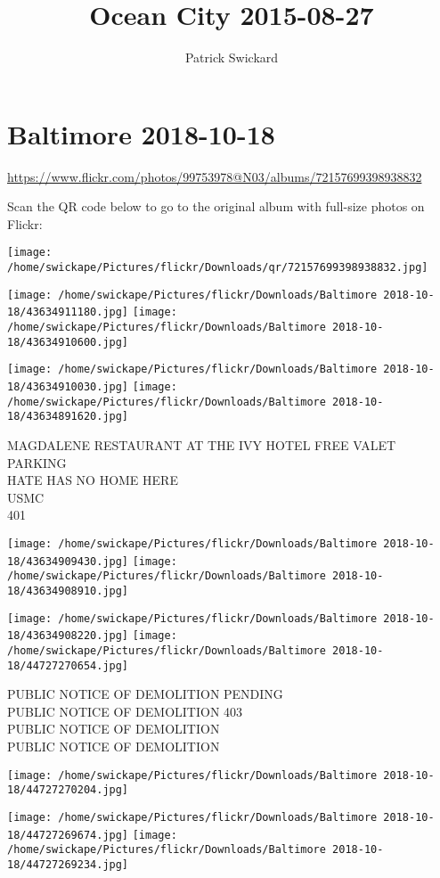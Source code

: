 \documentclass[10pt,letterpaper]{article}
\title{Ocean City 2015-08-27}
\author{Patrick Swickard}
\date{}
\begin{document}
\section*{Baltimore 2018-10-18}

\url{https://www.flickr.com/photos/99753978@N03/albums/72157699398938832}

Scan the QR code below to go to the original album with full-size photos on Flickr:

\texttt{[image: /home/swickape/Pictures/flickr/Downloads/qr/72157699398938832.jpg]}
\pagebreak

\texttt{[image: /home/swickape/Pictures/flickr/Downloads/Baltimore 2018-10-18/43634911180.jpg]}
\texttt{[image: /home/swickape/Pictures/flickr/Downloads/Baltimore 2018-10-18/43634910600.jpg]}

\texttt{[image: /home/swickape/Pictures/flickr/Downloads/Baltimore 2018-10-18/43634910030.jpg]}
\texttt{[image: /home/swickape/Pictures/flickr/Downloads/Baltimore 2018-10-18/43634891620.jpg]}

MAGDALENE RESTAURANT AT THE IVY HOTEL FREE VALET PARKING\\
HATE HAS NO HOME HERE\\
USMC\\
401
\pagebreak

\texttt{[image: /home/swickape/Pictures/flickr/Downloads/Baltimore 2018-10-18/43634909430.jpg]}
\texttt{[image: /home/swickape/Pictures/flickr/Downloads/Baltimore 2018-10-18/43634908910.jpg]}

\texttt{[image: /home/swickape/Pictures/flickr/Downloads/Baltimore 2018-10-18/43634908220.jpg]}
\texttt{[image: /home/swickape/Pictures/flickr/Downloads/Baltimore 2018-10-18/44727270654.jpg]}

PUBLIC NOTICE OF DEMOLITION PENDING\\
PUBLIC NOTICE OF DEMOLITION 403\\
PUBLIC NOTICE OF DEMOLITION\\
PUBLIC NOTICE OF DEMOLITION
\pagebreak

\texttt{[image: /home/swickape/Pictures/flickr/Downloads/Baltimore 2018-10-18/44727270204.jpg]}

\vspace{0.25in}
\texttt{[image: /home/swickape/Pictures/flickr/Downloads/Baltimore 2018-10-18/44727269674.jpg]}
\texttt{[image: /home/swickape/Pictures/flickr/Downloads/Baltimore 2018-10-18/44727269234.jpg]}
\end{document}
